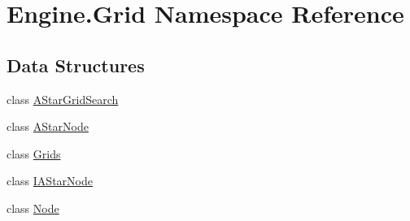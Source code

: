 \hypertarget{a00251}{}\section{Engine.\+Grid Namespace Reference}
\label{a00251}
\subsection*{Data Structures}
\begin{DoxyCompactItemize}
\item 
class \hyperlink{a00398}{A\+Star\+Grid\+Search}
\item 
class \hyperlink{a00402}{A\+Star\+Node}
\item 
class \hyperlink{a00406}{Grids}
\item 
class \hyperlink{a00410}{I\+A\+Star\+Node}
\item 
class \hyperlink{a00414}{Node}
\end{DoxyCompactItemize}
